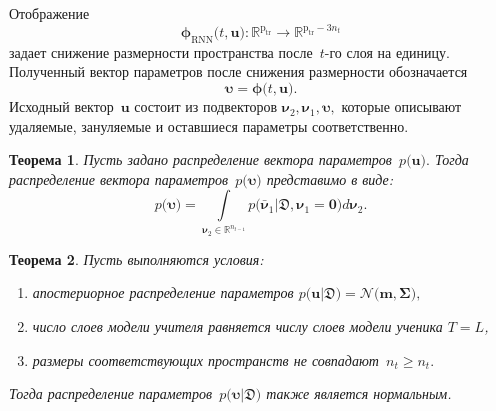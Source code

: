 \documentclass{dissert}
\newtheorem{theorem}{Теорема}
\begin{document}
Отображение
\[
\bm{\phi}_{\text{RNN}}\bigr(t, \mathbf{u}\bigr) : \mathbb{R}^{\text{p}_{\text{tr}}} \to \mathbb{R}^{\text{p}_{\text{tr}}-3n_t}
\]
задает снижение размерности пространства после~$t$-го слоя на единицу. Полученный вектор параметров после снижения размерности обозначается
\[
\bm{\upsilon} = \bm{\phi}\bigr(t, \mathbf{u}\bigr).
\]
Исходный вектор~$\mathbf{u}$ состоит из подвекторов $\bm{\nu}_2, {\bm{\nu}}_1, \bm{\upsilon},$ которые описывают удаляемые, зануляемые и оставшиеся параметры соответственно.

\begin{theorem}
Пусть задано распределение вектора параметров~$p\bigr(\mathbf{u}\bigr).$ Тогда распределение вектора параметров~$p\bigr(\bm{\upsilon}\bigr)$ представимо в виде:
\[
p\bigr(\bm{\upsilon}\bigr)  = \int\limits_{ \bm{\nu}_2 \in \mathbb{R}^{n_{t-1}}}p\bigr(\bar{\bm{\nu}}_1|\mathfrak{D}, \bm{\nu}_1=\mathbf{0}\bigr) d \bm{\nu}_2.
\]
\end{theorem}

\begin{theorem}
Пусть выполняются условия:
\begin{enumerate}
\item[1)] апостериорное распределение параметров $p\bigr(\mathbf{u}|\mathfrak{D}\bigr) = \mathcal{N}\bigr(\mathbf{m}, \bm{\Sigma}\bigr),$
\item[2)] число слоев модели учителя равняется числу слоев модели ученика $T=L$,
\item[3)] размеры соответствующих пространств не совпадают~$n_t \geq n_t.$
\end{enumerate}
Тогда распределение параметров~$p\bigr(\bm{\upsilon}|\mathfrak{D}\bigr)$ также является нормальным.
\end{theorem}
\end{document}
